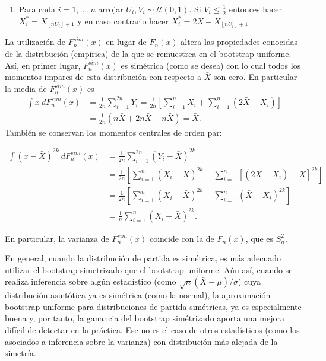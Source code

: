 \documentclass[
]{book}
\providecommand{\tightlist}{%
  \setlength{\itemsep}{0pt}\setlength{\parskip}{0pt}}
\theoremstyle{break}
\theoremstyle{definition}
\theoremstyle{definition}
\theoremstyle{definition}
\theoremstyle{remark}
\begin{document}
\begin{enumerate}
\def\labelenumi{\arabic{enumi}.}
\tightlist
\item
  Para cada \(i=1,\ldots ,n\) arrojar
  \(U_i,V_i\sim \mathcal{U}\left( 0,1 \right)\). Si \(V_i\leq \frac{1}{2}\)
  entonces hacer \(X_i^{\ast}=X_{\left\lfloor nU_i\right\rfloor +1}\) y en caso contrario hacer
  \(X_i^{\ast}=2\overline{X }-X_{\left\lfloor nU_i\right\rfloor +1}\)
\end{enumerate}

La utilización de \(F_n^{sim}\left( x \right)\) en lugar de \(F_n\left( x \right)\) altera las propiedades conocidas de la distribución
(empírica) de la que se remuestrea en el bootstrap uniforme. Así, en
primer lugar, \(F_n^{sim}\left( x \right)\) es simétrica (como se desea)
con lo cual todos los momentos impares de esta distribución con respecto
a \(\bar{X}\) son cero.
En particular la media de \(F_n^{sim}\left(x \right)\) es
\[\begin{aligned}
\int x~dF_n^{sim}\left( x \right) &= \frac{1}{2n}\sum_{i=1}^{2n}Y_i=\frac{
1}{2n}\left[ \sum_{i=1}^{n}X_i+\sum_{i=1}^{n}\left( 2\bar{X}
-X_i \right) \right] \\
&= \frac{1}{2n}\left( n\bar{X}+2n\bar{X}-n\bar{X} \right) =
\bar{X}.\end{aligned}\]
También se conservan los momentos centrales de orden par:

\[\begin{aligned}
\int \left( x-\bar{X} \right)^{2k}~dF_n^{sim}\left( x \right) &= \frac{
1}{2n}\sum_{i=1}^{2n}\left( Y_i-\bar{X} \right)^{2k} \\
&= \frac{1}{2n}\left[ \sum_{i=1}^{n}\left( X_i-\bar{X} \right)
^{2k}+\sum_{i=1}^{n}\left[ \left( 2\bar{X}-X_i \right) -\bar{X}
\right]^{2k}\right] \\
&= \frac{1}{2n}\left[ \sum_{i=1}^{n}\left( X_i-\bar{X} \right)
^{2k}+\sum_{i=1}^{n}\left( \bar{X}-X_i \right)^{2k}\right] \\
&= \frac{1}{n}\sum_{i=1}^{n}\left( X_i-\bar{X} \right)^{2k}.
\end{aligned}\]

En particular, la varianza de \(F_n^{sim}\left( x \right)\) coincide con
la de \(F_n\left( x \right)\), que es \(S_n^2\).

En general, cuando la distribución de partida es simétrica, es más
adecuado utilizar el bootstrap simetrizado que el bootstrap uniforme.
Aún así, cuando se realiza inferencia sobre algún estadístico (como
\(\sqrt{n}(\bar{X}-\mu)/\sigma\)) cuya distribución
asintótica ya es simétrica (como la normal), la aproximación bootstrap
uniforme para distribuciones de partida simétricas, ya es especialmente
buena y, por tanto, la ganancia del bootstrap simétrizado aporta una
mejora difícil de detectar en la práctica. Ese no es el caso de otros
estadísticos (como los asociados a inferencia sobre la varianza) con
distribución más alejada de la simetría.
\end{document}
